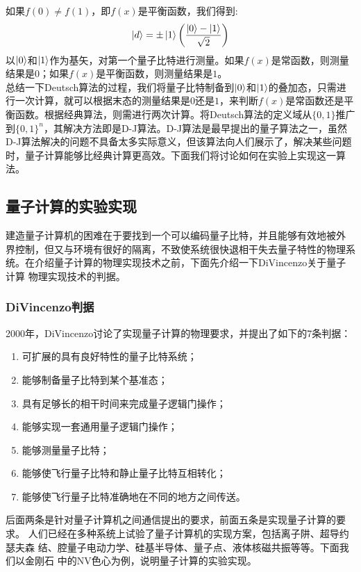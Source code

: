 \documentclass[a4paper]{article}
\begin{document}
如果$ f(0) \neq f(1) $，即$ f(x)  $是平衡函数，我们得到:
\begin{equation}\label{key}
\ket{d} = \pm\ket{1}\qty(\dfrac{\ket{0} - \ket{1}}{\sqrt{2}})
\end{equation}
以$ \ket{0} $和$ \ket{1} $作为基矢，对第一个量子比特进行测量。如果$ f(x)  $是常函数，则测量结果是$ 0 $；如果$ f(x)  $是平衡函数，则测量结果是$ 1 $。\\
总结一下Deutsch算法的过程，我们将量子比特制备到$ \ket{0} $和$ \ket{1} $的叠加态，只需进行一次计算，就可以根据末态的测量结果是$ 0  $还是$ 1 $，来判断$ f(x)  $是常函数还是平衡函数。根据经典算法，则需进行两次计算。将Deutsch算法的定义域从$ \{0,1\} $推广到$ \{0,1\}^n $，其解决方法即是D-J算法。D-J算法是最早提出的量子算法之一，虽然D-J算法解决的问题不具备太多实际意义，但该算法向人们展示了，解决某些问题时，量子计算能够比经典计算更高效。下面我们将讨论如何在实验上实现这一算法。

\subsection{量子计算的实验实现}
建造量子计算机的困难在于要找到一个可以编码量子比特，并且能够有效地被外
界控制，但又与环境有很好的隔离，不致使系统很快退相干失去量子特性的物理系
统。在介绍量子计算的物理实现技术之前，下面先介绍一下DiVincenzo关于量子计算
物理实现技术的判据\cite{Divincenzo2000The}。
\subsubsection{DiVincenzo判据}
2000年，DiVincenzo讨论了实现量子计算的物理要求，并提出了如下的7条判据：
\begin{enumerate}
	\item 可扩展的具有良好特性的量子比特系统；
	\item 能够制备量子比特到某个基准态；
	\item 具有足够长的相干时间来完成量子逻辑门操作；
    \item 能够实现一套通用量子逻辑门操作；
	\item 能够测量量子比特；
	\item 能够使飞行量子比特和静止量子比特互相转化；
	\item 能够使飞行量子比特准确地在不同的地方之间传送。
\end{enumerate}
后面两条是针对量子计算机之间通信提出的要求，前面五条是实现量子计算的要求。
人们已经在多种系统上试验了量子计算机的实现方案，包括离子阱、超导约瑟夫森
结、腔量子电动力学、硅基半导体、量子点、液体核磁共振等等。下面我们以金刚石
中的NV色心为例，说明量子计算的实验实现。
\end{document}
